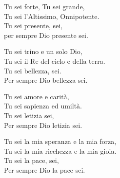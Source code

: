 

\spazio

\strofa Tu sei forte, Tu sei grande,\\
Tu sei l'Altissimo, Onnipotente.\\
Tu sei presente, sei,\\
per sempre Dio presente sei.

\spazio


\spazio

\strofa Tu sei trino e un solo Dio,\\
Tu sei il Re del cielo e della terra.\\
Tu sei bellezza, sei.\\
Per sempre Dio bellezza sei.

\spazio


\spazio

\strofa Tu sei amore e carità,\\
Tu sei sapienza ed umiltà.\\
Tu sei letizia sei,\\
Per sempre Dio letizia sei.

\spazio


\spazio

\strofa Tu sei la mia speranza e la mia forza,\\
Tu sei la mia ricchezza e la mia gioia.\\
Tu sei la pace, sei,\\
Per sempre Dio la pace sei.

\spazio


